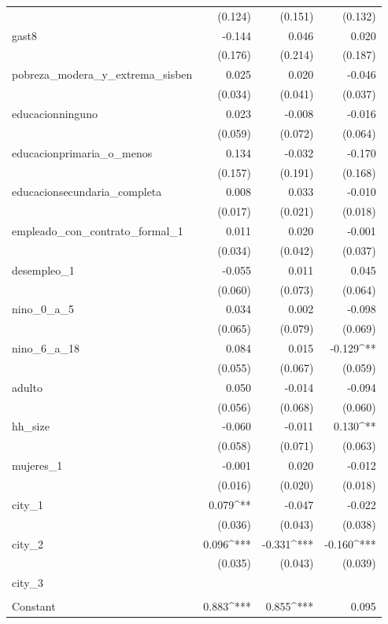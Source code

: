 \begin{table}[H]
\begin{tabular}{@{\extracolsep{5pt}}lD{.}{.}{-3} D{.}{.}{-3} D{.}{.}{-3} }
  & (0.124) & (0.151) & (0.132) \\ 
  gast8 & -0.144 & 0.046 & 0.020 \\ 
  & (0.176) & (0.214) & (0.187) \\ 
  pobreza\_modera\_y\_extrema\_sisben & 0.025 & 0.020 & -0.046 \\ 
  & (0.034) & (0.041) & (0.037) \\ 
  educacionninguno & 0.023 & -0.008 & -0.016 \\ 
  & (0.059) & (0.072) & (0.064) \\ 
  educacionprimaria\_o\_menos & 0.134 & -0.032 & -0.170 \\ 
  & (0.157) & (0.191) & (0.168) \\ 
  educacionsecundaria\_completa & 0.008 & 0.033 & -0.010 \\ 
  & (0.017) & (0.021) & (0.018) \\ 
  empleado\_con\_contrato\_formal\_1 & 0.011 & 0.020 & -0.001 \\ 
  & (0.034) & (0.042) & (0.037) \\ 
  desempleo\_1 & -0.055 & 0.011 & 0.045 \\ 
  & (0.060) & (0.073) & (0.064) \\ 
  nino\_0\_a\_5 & 0.034 & 0.002 & -0.098 \\ 
  & (0.065) & (0.079) & (0.069) \\ 
  nino\_6\_a\_18 & 0.084 & 0.015 & -0.129^{**} \\ 
  & (0.055) & (0.067) & (0.059) \\ 
  adulto & 0.050 & -0.014 & -0.094 \\ 
  & (0.056) & (0.068) & (0.060) \\ 
  hh\_size & -0.060 & -0.011 & 0.130^{**} \\ 
  & (0.058) & (0.071) & (0.063) \\ 
  mujeres\_1 & -0.001 & 0.020 & -0.012 \\ 
  & (0.016) & (0.020) & (0.018) \\ 
  city\_1 & 0.079^{**} & -0.047 & -0.022 \\ 
  & (0.036) & (0.043) & (0.038) \\ 
  city\_2 & 0.096^{***} & -0.331^{***} & -0.160^{***} \\ 
  & (0.035) & (0.043) & (0.039) \\ 
  city\_3 &  &  &  \\ 
  &  &  &  \\ 
  Constant & 0.883^{***} & 0.855^{***} & 0.095 \\ 

\end{tabular}
\end{table}
